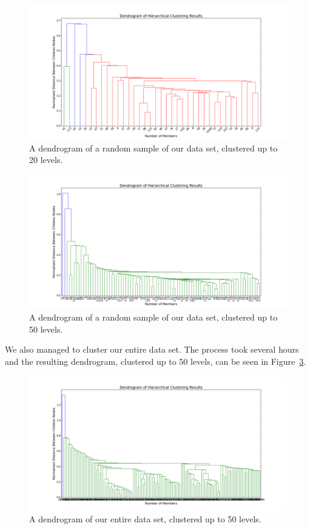 \documentclass[12pt]{article}
\begin{document}
\begin{figure}
    \includegraphics[width=\textwidth]{dend_rand_samp_20_levels.png}
    \caption{A dendrogram of a random sample of our data set, clustered up to 20 levels.}
    \label{fig:Dend_samp_20}
    
\end{figure}

\begin{figure}
    \includegraphics[width=\textwidth]{dend_pop_samp.png}
    \caption{A dendrogram of a random sample of our data set, clustered up to 50 levels.}
    \label{fig:Dend_samp_50}
    
\end{figure}

We also managed to cluster our entire data set.
The process took several hours and the resulting dendrogram, clustered up to 50 levels, can be seen in Figure~\ref{fig:Dend_all_50}.

\begin{figure}
    \includegraphics[width=\textwidth]{dend_50_full.png}
    \caption{A dendrogram of our entire data set, clustered up to 50 levels.}
    \label{fig:Dend_all_50}
    
\end{figure}
\end{document}
